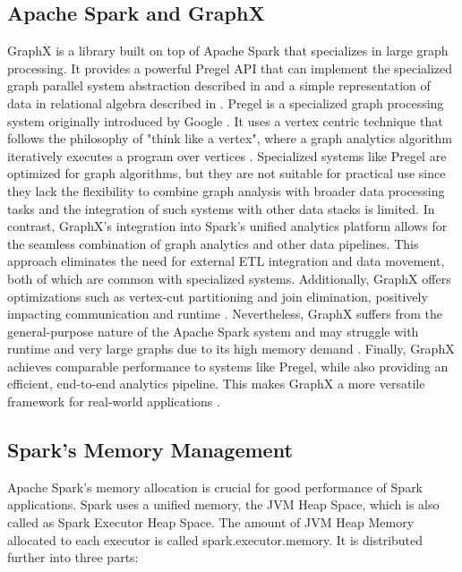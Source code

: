 \subsection{Apache Spark and GraphX}


GraphX is a library built on top of Apache Spark that specializes in large graph processing. It provides a powerful Pregel API that can implement the specialized graph parallel system abstraction described in\cite{malewicz_pregel_2010} and a simple representation of data in relational algebra described in \cite{xin_graphx_2014}. Pregel is a specialized graph processing system originally introduced by Google \cite{malewicz_pregel_2010}. It uses a vertex centric technique that follows the philosophy of "think like a vertex", where a graph analytics algorithm iteratively executes a program over vertices \cite{xin_graphx_2014}. 
Specialized systems like Pregel are optimized for graph algorithms, but they are not suitable for practical use since they lack the flexibility to combine graph analysis with broader data processing tasks and the integration of such systems with other data stacks is limited. In contrast, GraphX's integration into Spark's unified analytics platform allows for the seamless combination of graph analytics and other data pipelines. This approach eliminates the need for external ETL integration and data movement, both of which are common with specialized systems. Additionally, GraphX offers optimizations such as vertex-cut partitioning and join elimination, positively impacting communication and runtime \cite{xin_graphx_2014}. Nevertheless, GraphX suffers from the general-purpose nature of the Apache Spark system and may struggle with runtime and very large graphs due to its high memory demand \cite{zhuo_distributed_2021}.  
Finally, GraphX achieves comparable performance to systems like Pregel, while also providing an efficient, end-to-end analytics pipeline. This makes GraphX a more versatile framework for real-world applications \cite{xin_graphx_2014}.

\subsection{Spark's Memory Management}
Apache Spark's memory allocation is crucial for good performance of Spark applications. Spark uses a unified memory, the JVM Heap Space, which is also called as Spark Executor Heap Space. The amount of JVM Heap Memory allocated to each executor is called spark.executor.memory. It is distributed further into three parts: 

